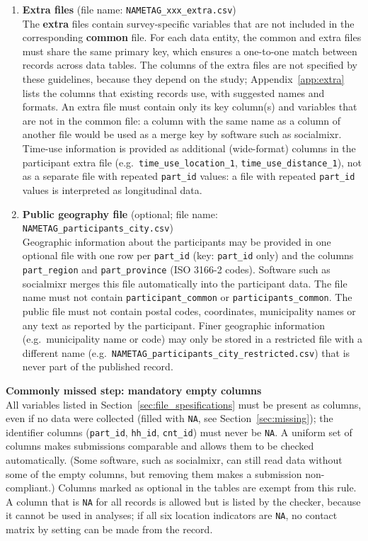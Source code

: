 \documentclass[11pt,a4paper]{article}
\begin{document}
\begin{enumerate}
    \item \textbf{Extra files} (file name: \texttt{NAMETAG\_xxx\_extra.csv}) \\
    The \textbf{extra} files contain survey-specific variables that are not included in the corresponding \textbf{common} file. For each data entity, the common and extra files must share the same primary key, which ensures a one-to-one match between records across data tables.
    The columns of the extra files are not specified by these guidelines, because they depend on the study; Appendix~\ref{app:extra} lists the columns that existing records use, with suggested names and formats.
    An extra file must contain only its key column(s) and variables that are not in the common file: a column with the same name as a column of another file would be used as a merge key by software such as socialmixr.
    Time-use information is provided as additional (wide-format) columns in the participant extra file (e.g.\ \texttt{time\_use\_location\_1}, \texttt{time\_use\_distance\_1}), not as a separate file with repeated \texttt{part\_id} values: a file with repeated \texttt{part\_id} values is interpreted as longitudinal data.

    \item \textbf{Public geography file} (optional; file name: \texttt{NAMETAG\_participants\_city.csv}) \\
    Geographic information about the participants may be provided in one optional file with one row per \texttt{part\_id} (key: \texttt{part\_id} only) and the columns \texttt{part\_region} and \texttt{part\_province} (ISO 3166-2 codes). Software such as socialmixr merges this file automatically into the participant data. The file name must not contain \texttt{participant\_common} or \texttt{participants\_common}. The public file must not contain postal codes, coordinates, municipality names or any text as reported by the participant. Finer geographic information (e.g.\ municipality name or code) may only be stored in a restricted file with a different name (e.g.\ \texttt{NAMETAG\_participants\_city\_restricted.csv}) that is never part of the published record.
\end{enumerate}

\noindent \textbf{Commonly missed step: mandatory empty columns} \\
All variables listed in Section~\ref{sec:file_spesifications} must be present as columns, even if no data were collected (filled with \texttt{NA}, see Section~\ref{sec:missing}); the identifier columns (\texttt{part\_id}, \texttt{hh\_id}, \texttt{cnt\_id}) must never be \texttt{NA}. A uniform set of columns makes submissions comparable and allows them to be checked automatically. (Some software, such as socialmixr, can still read data without some of the empty columns, but removing them makes a submission non-compliant.) Columns marked as optional in the tables are exempt from this rule. A column that is \texttt{NA} for all records is allowed but is listed by the checker, because it cannot be used in analyses; if all six location indicators are \texttt{NA}, no contact matrix by setting can be made from the record.
\end{document}

